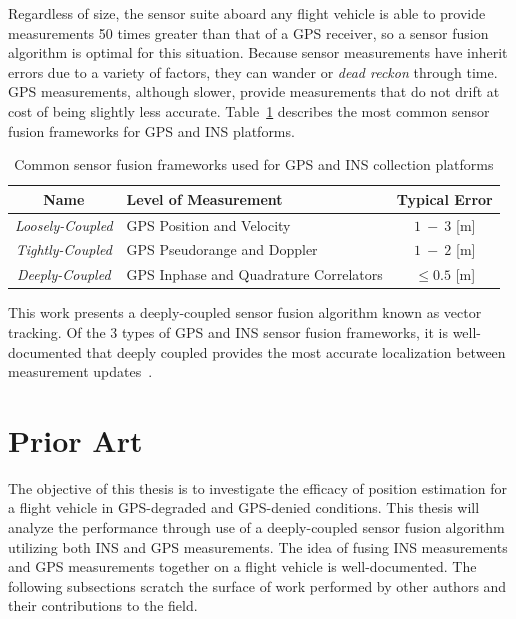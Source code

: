 Regardless of size, the sensor suite aboard any flight vehicle is able to provide measurements 50 times greater than that of a GPS receiver, so a sensor fusion algorithm is optimal for this situation. Because sensor measurements have inherit errors due to a variety of factors, they can wander or \textit{dead reckon} through time. GPS measurements, although slower, provide measurements that do not drift at cost of being slightly less accurate. Table~\ref{tbl:sensorfusionframeworks} describes the most common sensor fusion frameworks for GPS and INS platforms.
\begin{table}[!ht]\label{tbl:sensorfusionframeworks}
    \caption{Common sensor fusion frameworks used for GPS and INS collection platforms}
    \centering
    \begin{tabular}{clc}
        \toprule
        \textbf{Name}            & \textbf{Level of Measurement}          & \textbf{Typical Error} \\
        \midrule
        \textit{Loosely-Coupled} & GPS Position and Velocity              & \(1~-~3\) [m]          \\
        \textit{Tightly-Coupled} & GPS Pseudorange and Doppler            & \(1~-~2\) [m]          \\
        \textit{Deeply-Coupled}  & GPS Inphase and Quadrature Correlators & \(\leq0.5\) [m]        \\
        \bottomrule
    \end{tabular}
\end{table}
This work presents a deeply-coupled sensor fusion algorithm known as vector tracking. Of the 3 types of GPS and INS sensor fusion frameworks, it is well-documented that deeply coupled provides the most accurate localization between measurement updates~\cite{wattsGPSGLONASSL12019}.
\section{Prior Art}
The objective of this thesis is to investigate the efficacy of position estimation for a flight vehicle in GPS-degraded and GPS-denied conditions. This thesis will analyze the performance through use of a deeply-coupled sensor fusion algorithm utilizing both INS and GPS measurements. The idea of fusing INS measurements and GPS measurements together on a flight vehicle is well-documented. The following subsections scratch the surface of work performed by other authors and their contributions to the field.
